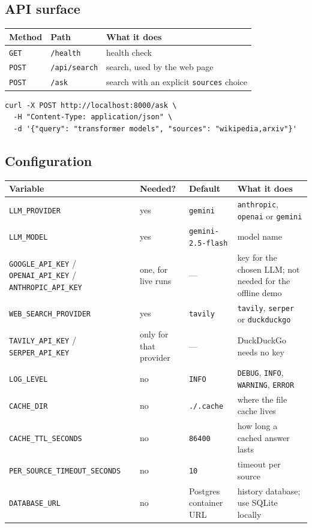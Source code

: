\documentclass[11pt,a4paper]{article}
\newcommand{\code}[1]{\texttt{\small #1}}
\begin{document}
\subsection{API surface}
\begin{center}
\begin{tabular}{@{}llp{7.5cm}@{}}
\toprule
\textbf{Method} & \textbf{Path} & \textbf{What it does} \\
\midrule
\code{GET}  & \code{/health}      & health check \\
\code{POST} & \code{/api/search}  & search, used by the web page \\
\code{POST} & \code{/ask}         & search with an explicit \code{sources} choice \\
\bottomrule
\end{tabular}
\end{center}

\begin{lstlisting}[style=shell,caption={Example request}]
curl -X POST http://localhost:8000/ask \
  -H "Content-Type: application/json" \
  -d '{"query": "transformer models", "sources": "wikipedia,arxiv"}'
\end{lstlisting}

\subsection{Configuration}
\begin{center}
\footnotesize
\begin{longtable}{@{}p{4.3cm}p{1.9cm}p{3.6cm}p{4.6cm}@{}}
\toprule
\textbf{Variable} & \textbf{Needed?} & \textbf{Default} & \textbf{What it does} \\
\midrule
\endhead
\code{LLM\_PROVIDER} & yes & \code{gemini} & \code{anthropic}, \code{openai} or \code{gemini} \\
\code{LLM\_MODEL} & yes & \code{gemini-2.5-flash} & model name \\
\code{GOOGLE\_API\_KEY} / \code{OPENAI\_API\_KEY} / \code{ANTHROPIC\_API\_KEY} & one, for live runs & --- & key for the chosen LLM; not needed for the offline demo \\
\code{WEB\_SEARCH\_PROVIDER} & yes & \code{tavily} & \code{tavily}, \code{serper} or \code{duckduckgo} \\
\code{TAVILY\_API\_KEY} / \code{SERPER\_API\_KEY} & only for that provider & --- & DuckDuckGo needs no key \\
\code{LOG\_LEVEL} & no & \code{INFO} & \code{DEBUG}, \code{INFO}, \code{WARNING}, \code{ERROR} \\
\code{CACHE\_DIR} & no & \code{./.cache} & where the file cache lives \\
\code{CACHE\_TTL\_SECONDS} & no & \code{86400} & how long a cached answer lasts \\
\code{PER\_SOURCE\_TIMEOUT\_SECONDS} & no & \code{10} & timeout per source \\
\code{DATABASE\_URL} & no & Postgres container URL & history database; use SQLite locally \\
\bottomrule
\end{longtable}
\end{center}
\end{document}
